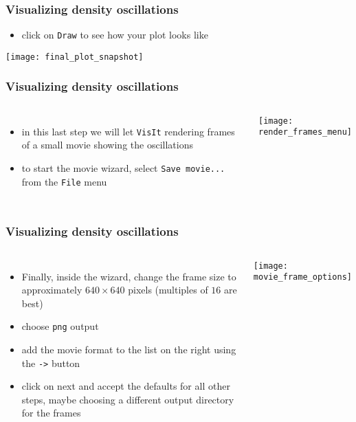 \begin{frame}
\frametitle{Visualizing density oscillations}
\begin{itemize}
\item click on \texttt{Draw} to see how your plot looks like
\end{itemize}
\begin{center}
\texttt{[image: final\_plot\_snapshot]}
\end{center}
\end{frame}

\begin{frame}
\frametitle{Visualizing density oscillations}
\begin{columns}
\column{60mm}
\begin{itemize}
\item in this last step we will let \texttt{VisIt} rendering frames of a small movie showing the oscillations
\item to start the movie wizard, select \texttt{Save movie...} from the \texttt{File} menu
\end{itemize}
\column{60mm}
\texttt{[image: render\_frames\_menu]}
\end{columns}
\end{frame}

\begin{frame}
\frametitle{Visualizing density oscillations}
\begin{columns}
\column{60mm}
\begin{itemize}
\item Finally, inside the wizard, change the frame size to approximately $640\times640$ pixels (multiples of $16$ are best)
\item choose \texttt{png} output
\item add the movie format to the list on the right using the \texttt{->} button
\item click on next and accept the defaults for all other steps, maybe choosing a different output directory for the frames
\end{itemize}
\column{60mm}
\texttt{[image: movie\_frame\_options]}
\end{columns}
\end{frame}

